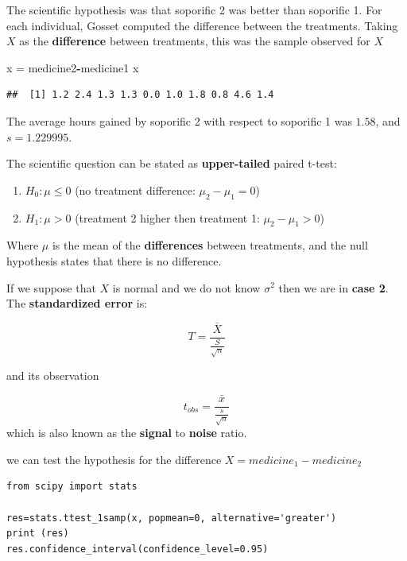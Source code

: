 \documentclass[
]{book}
\newenvironment{Shaded}{\begin{snugshade}}{\end{snugshade}}
\newcommand{\NormalTok}[1]{#1}
\newcommand{\OtherTok}[1]{\textcolor[rgb]{0.56,0.35,0.01}{#1}}
\newcommand{\SpecialCharTok}[1]{\textcolor[rgb]{0.81,0.36,0.00}{\textbf{#1}}}
\providecommand{\tightlist}{%
  \setlength{\itemsep}{0pt}\setlength{\parskip}{0pt}}
\begin{document}
The scientific hypothesis was that soporific 2 was better than soporific 1. For each individual, Gosset computed the difference between the treatments. Taking \(X\) as the \textbf{difference} between treatments, this was the sample observed for \(X\)

\begin{Shaded}
\begin{Highlighting}[]
\NormalTok{x }\OtherTok{=}\NormalTok{ medicine2}\SpecialCharTok{{-}}\NormalTok{medicine1}
\NormalTok{x}
\end{Highlighting}
\end{Shaded}

\begin{verbatim}
##  [1] 1.2 2.4 1.3 1.3 0.0 1.0 1.8 0.8 4.6 1.4
\end{verbatim}

The average hours gained by soporific 2 with respect to soporific 1 was \(1.58\), and \(s=1.229995\).

The scientific question can be stated as \textbf{upper-tailed} paired t-test:

\begin{enumerate}
\def\labelenumi{\alph{enumi}.}
\tightlist
\item
  \(H_0:\mu \leq 0\) (no treatment difference: \(\mu_2-\mu_1=0\))
\item
  \(H_1:\mu > 0\) (treatment 2 higher then treatment 1: \(\mu_2-\mu_1>0\))
\end{enumerate}

Where \(\mu\) is the mean of the \textbf{differences} between treatments, and the null hypothesis states that there is no difference.

If we suppose that \(X\) is normal and we do not know \(\sigma^2\) then we are in \textbf{case 2}. The \textbf{standardized error} is:

\[T=\frac{\bar{X}}{\frac{S}{\sqrt{n}}}\]

and its observation

\[t_{obs}=\frac{\bar{x}}{\frac{s}{\sqrt{n}}}\]
which is also known as the \textbf{signal} to \textbf{noise} ratio.

we can test the hypothesis for the difference \(X=medicine_1-medicine_2\)

\begin{verbatim}
from scipy import stats

res=stats.ttest_1samp(x, popmean=0, alternative='greater')
print (res)
res.confidence_interval(confidence_level=0.95)
\end{verbatim}
\end{document}
